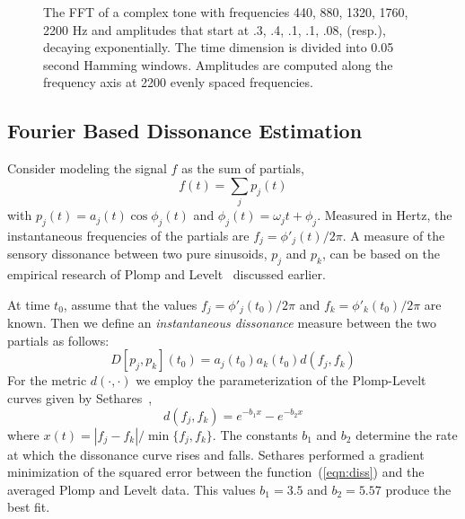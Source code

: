 \begin{figure}
  \caption{{\small The FFT of a complex tone with frequencies 440, 880,
  1320, 1760, 2200 Hz and amplitudes that start at .3, .4, .1, .1, .08,
  (resp.), decaying exponentially.  The time dimension is divided into
  0.05 second Hamming windows.  Amplitudes are computed along the
  frequency axis at 2200 evenly spaced frequencies.}}
  \label{fig:SpecFFTHam2200}
\end{figure}

\subsection{Fourier Based Dissonance Estimation}
\label{sec:FourierDissonance}
Consider modeling the signal $f$ as the sum of partials,
\[
f(t) = \sum_j p_j(t)
\]
with $p_j(t) = a_j(t)\cos\phi_j(t)$ and 
$\phi_j(t)= \omega_jt+\phi_j$.
Measured in Hertz, the instantaneous frequencies of the partials are
$f_j  = \phi'_j(t)/2\pi$.
A measure of the sensory dissonance between two pure sinusoids, $p_j$
and $p_k$, can be based on the empirical research of Plomp and
Levelt~\cite{Plomp:1965} discussed earlier.  

At time $t_0$, assume that the values $f_j = \phi'_j(t_0)/2\pi$ and
$f_k = \phi'_k(t_0)/2\pi$ are known.  Then we define an
\emph{instantaneous dissonance} measure between the two partials as
follows: 
\[
D[p_j,p_k](t_0)= a_j(t_0)a_k(t_0)d(f_j,f_k)
\]
For the metric $d(\cdot,\cdot)$ we employ the parameterization of the
Plomp-Levelt curves given by Sethares~\cite{Sethares:1997},
\begin{equation}
\label{eqn:diss}
d(f_j,f_k) = e^{-b_1x} - e^{-b_2x}
\end{equation} 
where $x(t) = |f_j - f_k|/\min\{f_j,f_k\}$.  The constants
$b_1$ and $b_2$ determine the rate at which the dissonance curve rises
and falls. %
Sethares performed a gradient minimization of the squared error between
the function~(\ref{eqn:diss}) and the averaged Plomp and
Levelt data.  This values $b_1 = 3.5$ and $b_2=5.57$ produce the best
fit. 

